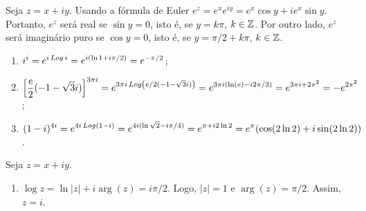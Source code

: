 \begin{questions}
\begin{solution}
    Seja $z = x+iy$. Usando a fórmula de Euler $e^z = e^x e^{iy} = e^x \cos y + i e^x \sin y$. Portanto, $e^z$ será real se $\sin y = 0$, isto é, se $y = k\pi$, $k\in{\mathbb Z}$. Por outro lado, $e^z$ será imaginário puro se $\cos y = 0$, isto é, se $y = \pi/2+k\pi$, $k\in{\mathbb Z}$.
\end{solution}

\setcounter{question}{6}

\begin{solution}
    \begin{enumerate}[label=(\alph*)]
      \item $\displaystyle i^i = e^{i \mathop{Log} i} = e^{i(\ln 1 + i\pi/2)} = e^{-\pi/2}$;
      \item $\displaystyle \left[ \frac{e}{2} (-1 - \sqrt{3} i) \right]^{3\pi i}
        = e^{3\pi i \mathop{Log}\left(e/2 (-1-\sqrt{3}i)\right)}
        = e^{3\pi i (\ln(e) - i 2 \pi/3 )}
        = e^{3\pi i + 2 \pi^2} = -e^{2\pi^2}$;
      \item $\displaystyle (1 - i)^{4i} = e^{4i\mathop{Log}(1-i)}
        = e^{4i(\ln \sqrt 2 - i \pi/4)}
        = e^{\pi+ i 2\ln 2} = e^{\pi} (\cos (2\ln 2) + i \sin (2\ln2) )$.
    \end{enumerate}
\end{solution}


\begin{solution}
Seja $z = x+iy$.
\begin{enumerate}[label=(\alph*)]
    \item $\displaystyle \log z = \ln|z| + i\arg(z) = i \pi/2$.
    Logo, $|z| = 1$ e $\arg(z) = \pi/2$. Assim, $z = i$.
    

\end{enumerate}
\end{solution}
\end{questions}
